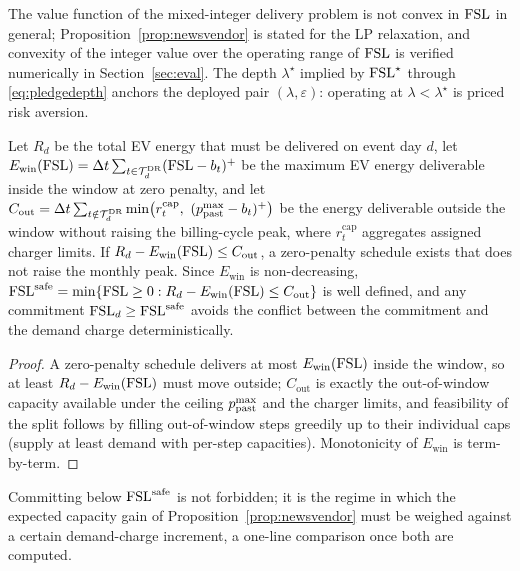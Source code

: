 \begin{remark}\label{rem:milp}
The value function of the mixed-integer delivery problem is not convex
in $\mathrm{FSL}$ in general; Proposition~\ref{prop:newsvendor} is stated for
the LP relaxation, and convexity of the integer value over the
operating range of $\mathrm{FSL}$ is verified numerically in Section~\ref{sec:eval}. The
depth $\lambda^{\star}$ implied by $\mathrm{FSL}^{\star}$ through
\eqref{eq:pledgedepth} anchors the deployed pair
$(\lambda, \varepsilon)$: operating at $\lambda < \lambda^{\star}$ is
priced risk aversion.
\end{remark}

\begin{proposition}\label{prop:guardrail}
Let $R_d$ be the total EV energy that must be delivered on event day
$d$, let
$E_{\mathrm{win}}(\mathrm{FSL}) = \Delta t \sum_{t \in \mathcal{T}^{\mathrm{DR}}_{d}}
(\mathrm{FSL} - b_{t})^{+}$
be the maximum EV energy deliverable inside the window at zero
penalty, and let
$C_{\mathrm{out}} = \Delta t \sum_{t \notin \mathcal{T}^{\mathrm{DR}}_{d}}
\min\bigl(r^{\mathrm{cap}}_t,\ (p^{\max}_{\mathrm{past}} - b_{t})^{+}\bigr)$
be the energy deliverable outside the window without raising the
billing-cycle peak, where $r^{\mathrm{cap}}_t$ aggregates assigned
charger limits. If $R_d - E_{\mathrm{win}}(\mathrm{FSL}) \le
C_{\mathrm{out}}$, a zero-penalty schedule exists that does not raise
the monthly peak. Since $E_{\mathrm{win}}$ is non-decreasing,
$\mathrm{FSL}^{\mathrm{safe}} = \min\{\mathrm{FSL} \ge 0 : R_d - E_{\mathrm{win}}(\mathrm{FSL}) \le
C_{\mathrm{out}}\}$
is well defined, and any commitment $\mathrm{FSL}_d \ge \mathrm{FSL}^{\mathrm{safe}}$ avoids the
conflict between the commitment and the demand charge
deterministically.
\end{proposition}

\begin{proof}
A zero-penalty schedule delivers at most $E_{\mathrm{win}}(\mathrm{FSL})$
inside the window, so at least $R_d - E_{\mathrm{win}}(\mathrm{FSL})$ must
move outside; $C_{\mathrm{out}}$ is exactly the out-of-window capacity
available under the ceiling $p^{\max}_{\mathrm{past}}$ and the charger limits, and
feasibility of the split follows by filling out-of-window steps
greedily up to their individual caps (supply at least demand with
per-step capacities). Monotonicity of $E_{\mathrm{win}}$ is
term-by-term.
\end{proof}

Committing below $\mathrm{FSL}^{\mathrm{safe}}$ is not forbidden; it is the regime in which
the expected capacity gain of Proposition~\ref{prop:newsvendor} must
be weighed against a certain demand-charge increment, a one-line
comparison once both are computed.

